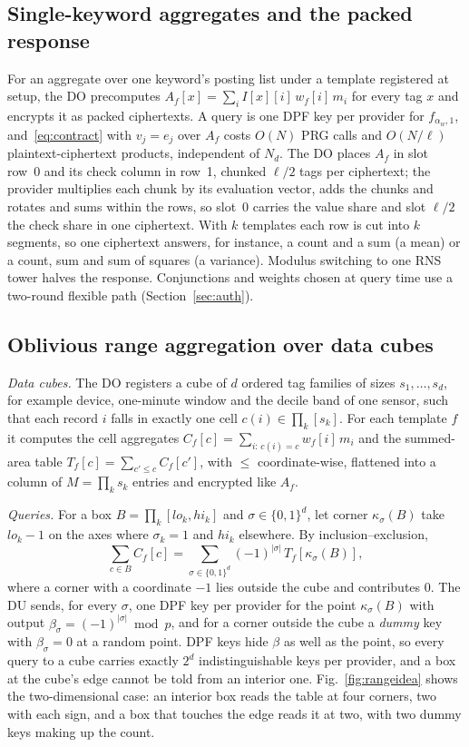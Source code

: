 \subsection{Single-keyword aggregates and the packed response}
\label{sec:fast}
For an aggregate over one keyword's posting list under a template registered
at setup, the DO precomputes $A_f[x]=\sum_i I[x][i]\,w_f[i]\,m_i$ for every
tag $x$ and encrypts it as packed ciphertexts. A query is one DPF key per
provider for $f_{\alpha_w,1}$, and~\eqref{eq:contract} with $v_j=e_j$ over
$A_f$ costs $O(N)$ PRG calls and $O(N/\ell)$ plaintext-ciphertext products,
independent of $N_d$. The DO places $A_f$ in slot row~0 and its check column
in row~1, chunked $\ell/2$ tags per ciphertext; the provider multiplies each
chunk by its evaluation vector, adds the chunks and rotates and sums within
the rows, so slot~0 carries the value share and slot $\ell/2$ the check share
in one ciphertext. With $k$ templates each row is cut into $k$ segments, so
one ciphertext answers, for instance, a count and a sum (a mean) or a count,
sum and sum of squares (a variance). Modulus switching to one RNS tower halves
the response. Conjunctions and weights chosen at query time use a two-round
flexible path (Section~\ref{sec:auth}).

\subsection{Oblivious range aggregation over data cubes}
\label{sec:range}
\emph{Data cubes.} The DO registers a cube of $d$ ordered tag families of sizes
$s_1,\dots,s_d$, for example device, one-minute window and the decile band of
one sensor, such that each record $i$ falls in exactly one cell
$c(i)\in\prod_k[s_k]$. For each template $f$ it computes the cell aggregates
$C_f[c]=\sum_{i:\,c(i)=c}w_f[i]\,m_i$ and the summed-area table
$T_f[c]=\sum_{c'\le c}C_f[c']$, with $\le$ coordinate-wise, flattened into a
column of $M=\prod_ks_k$ entries and encrypted like $A_f$.

\emph{Queries.} For a box $B=\prod_k[\mathit{lo}_k,\mathit{hi}_k]$ and
$\sigma\in\{0,1\}^d$, let corner $\kappa_\sigma(B)$ take $\mathit{lo}_k-1$ on
the axes where $\sigma_k=1$ and $\mathit{hi}_k$ elsewhere. By
inclusion--exclusion,
\begin{equation}
\label{eq:ie}
\sum_{c\in B}C_f[c]=\sum_{\sigma\in\{0,1\}^d}(-1)^{|\sigma|}\,T_f[\kappa_\sigma(B)],
\end{equation}
where a corner with a coordinate $-1$ lies outside the cube and contributes
$0$. The DU sends, for every $\sigma$, one DPF key per provider for the point
$\kappa_\sigma(B)$ with output $\beta_\sigma=(-1)^{|\sigma|}\bmod p$, and for a
corner outside the cube a \emph{dummy} key with $\beta_\sigma=0$ at a random
point. DPF keys hide $\beta$ as well as the point, so every query to a cube
carries exactly $2^d$ indistinguishable keys per provider, and a box at the
cube's edge cannot be told from an interior one. Fig.~\ref{fig:rangeidea}
shows the two-dimensional case: an interior box reads the table at four
corners, two with each sign, and a box that touches the edge reads it at two,
with two dummy keys making up the count.

